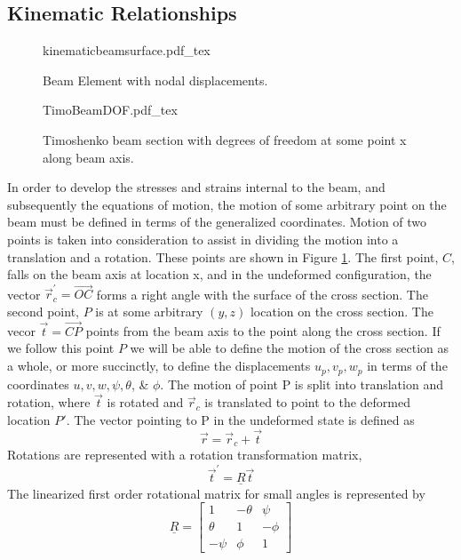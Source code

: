 \subsection{Kinematic Relationships} \label{Kinematic Relationships}
\begin{figure}
	\centering
	\def\svgwidth{400pt}
	{kinematicbeamsurface.pdf_tex}
	\caption{Beam Element with nodal displacements.}
	\label{fig:KineBeamElem}
\end{figure}
\begin{figure}
	\centering
	\def\svgwidth{250pt}
	{TimoBeamDOF.pdf_tex}
	\caption{Timoshenko beam section with degrees of freedom at some point x along beam axis.}
	\label{fig:TimoBeamDOF}
\end{figure}
In order to develop the stresses and strains internal to the beam, and subsequently the equations of motion, the motion of some arbitrary point on the beam must be defined in terms of the generalized coordinates. Motion of two points is taken into consideration to assist in dividing the motion into a translation and a rotation. These points are shown in Figure \ref{fig:KineBeamElem}. The first point, $ C $, falls on the beam axis at location x, and in the undeformed configuration, the vector $ \vec{r}_c^\prime= \overrightarrow{OC} $ forms a right angle with the surface of the cross section. The second point, $ P $ is at some arbitrary $ (y,z) $ location on the cross section. The vecor $ \vec{t}=\overrightarrow{CP} $ points from the beam axis to the point along the cross section. If we follow this point $ P $ we will be able to define the motion of the cross section as a whole, or more succinctly, to define the displacements $ u_p,v_p,w_p $ in terms of the coordinates $ u,v,w,\psi,\theta$, \& $\phi $. The motion of point P is split into translation and rotation, where $ \vec{t} $ is rotated and $ \vec{r}_c $ is translated to point to the deformed location $ P' $. The vector pointing to P in the undeformed state is defined as
\begin{equation}\label{eq:r}
\vec{r}=\vec{r}_c+\vec{t}
\end{equation}
Rotations are represented with a rotation transformation matrix,
\begin{equation}\label{eq:trot}
\vec{t}^\prime=\underline{R}\vec{t}
\end{equation}
The linearized first order rotational matrix for small angles is represented by 
\begin{equation}\label{eq:RotTransformation}
\underline{R}=\left[\begin{array}{ccc}
1&-\theta&\psi\\
\theta&1&-\phi\\
-\psi&\phi&1
\end{array}\right]
\end{equation}

